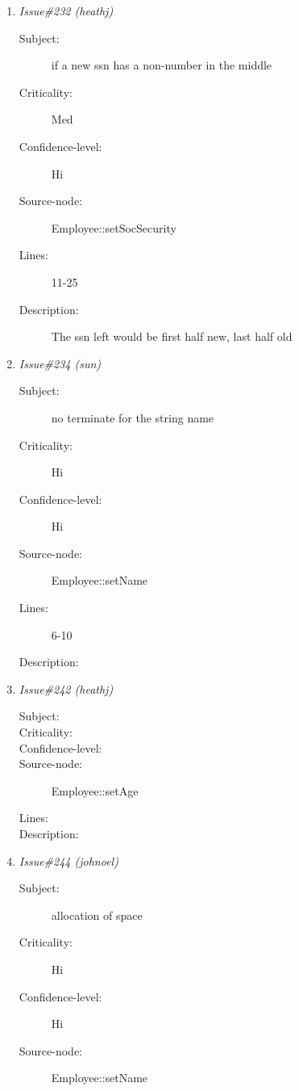 \begin{enumerate}
\begin{description}
\item [Lines:] 6-9

\item [Description:] if a new version of this name is longer, there
could be a overrun into the next field whereever.
\end{description}
\item {\it Issue\#232 (heathj)}
\begin{description}
\item [Subject:] if a new ssn has a non-number in the middle
\item [Criticality:] Med
\item [Confidence-level:] Hi
\item [Source-node:] Employee::setSocSecurity

\item [Lines:] 11-25

\item [Description:] The ssn left would be first half new, last
half old
\end{description}
\item {\it Issue\#234 (sun)}
\begin{description}
\item [Subject:] no terminate for the string name
\item [Criticality:] Hi
\item [Confidence-level:] Hi
\item [Source-node:] Employee::setName

\item [Lines:] 6-10

\item [Description:] 
\end{description}
\item {\it Issue\#242 (heathj)}
\begin{description}
\item [Subject:] 
\item [Criticality:] 
\item [Confidence-level:] 
\item [Source-node:] Employee::setAge

\item [Lines:] 

\item [Description:] 
\end{description}
\item {\it Issue\#244 (johnoel)}
\begin{description}
\item [Subject:] allocation of space
\item [Criticality:] Hi
\item [Confidence-level:] Hi
\item [Source-node:] Employee::setName


\end{description}
\end{enumerate}

